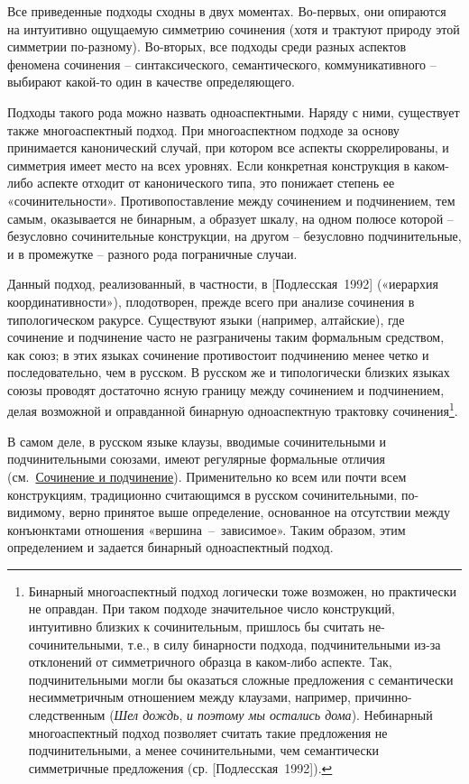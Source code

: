 Все приведенные подходы сходны в двух моментах. Во-первых, они опираются
на интуитивно ощущаемую симметрию сочинения (хотя и трактуют природу
этой симметрии по-разному). Во-вторых, все подходы среди разных аспектов
феномена сочинения -- синтаксического, семантического, коммуникативного
-- выбирают какой-то один в качестве определяющего.

Подходы такого рода можно назвать одноаспектными. Наряду с ними,
существует также многоаспектный подход. При многоаспектном подходе за
основу принимается канонический случай, при котором все аспекты
скоррелированы, и симметрия имеет место на всех уровнях. Если конкретная
конструкция в каком-либо аспекте отходит от канонического типа, это
понижает степень ее «сочинительности». Противопоставление между
сочинением и подчинением, тем самым, оказывается не бинарным, а образует
шкалу, на одном полюсе которой -- безусловно сочинительные конструкции,
на другом -- безусловно подчинительные, и в промежутке -- разного рода
пограничные случаи.

Данный подход, реализованный, в частности, в {[}Подлесская~1992{]}
(«иерархия координативности»), плодотворен, прежде всего при анализе
сочинения в типологическом ракурсе. Существуют языки (например,
алтайские), где сочинение и подчинение часто не разграничены таким
формальным средством, как союз; в этих языках сочинение противостоит
подчинению менее четко и последовательно, чем в русском. В русском же и
типологически близких языках союзы проводят достаточно ясную границу
между сочинением и подчинением, делая возможной и оправданной бинарную
одноаспектную трактовку сочинения\footnote{Бинарный многоаспектный
  подход логически тоже возможен, но практически не оправдан. При таком
  подходе значительное число конструкций, интуитивно близких к
  сочинительным, пришлось бы считать не-сочинительными, т.е., в силу
  бинарности подхода, подчинительными из-за отклонений от симметричного
  образца в каком-либо аспекте. Так, подчинительными могли бы оказаться
  сложные предложения с семантически несимметричным отношением между
  клаузами, например, причинно-следственным (\emph{Шел дождь}, \emph{и
  поэтому мы остались дома}). Небинарный многоаспектный подход позволяет
  считать такие предложения не подчинительными, а менее сочинительными,
  чем семантически симметричные предложения (ср. {[}Подлесская~1992{]}).}.

В самом деле, в русском языке клаузы, вводимые сочинительными и
подчинительными союзами, имеют регулярные формальные отличия
(см.~\underline{Сочинение и подчинение}). Применительно ко всем или
почти всем конструкциям, традиционно считающимся в русском
сочинительными, по-видимому, верно принятое выше определение, основанное
на отсутствии между конъюнктами отношения «вершина~--~зависимое». Таким
образом, этим определением и задается бинарный одноаспектный подход.

